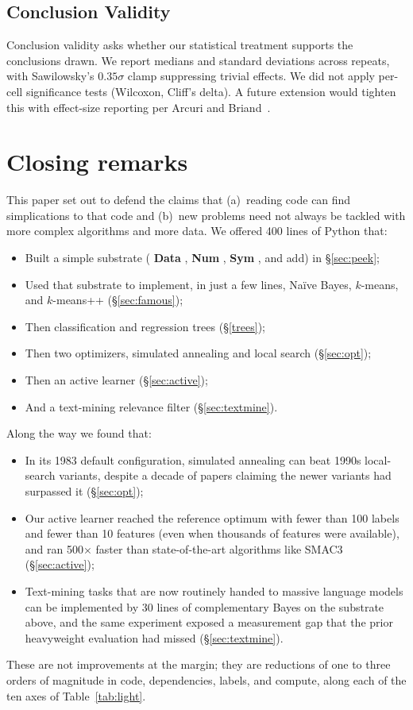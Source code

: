 \documentclass[AMA,STIX2COL]{WileyNJDv5}
\newcommand{\cls}[1]{%
  \setlength{\fboxsep}{1.5pt}%
  \colorbox{clsbg}{\sffamily\bfseries{#1}}%
}
\begin{document}
{\subsection{Conclusion Validity}
Conclusion validity asks whether our statistical treatment
supports the conclusions drawn. We report medians and
standard deviations across repeats, with Sawilowsky's
$0.35\sigma$ clamp suppressing trivial effects. We did not
apply per-cell significance tests (Wilcoxon, Cliff's delta).
A future extension would tighten this with effect-size
reporting per Arcuri and
Briand~\cite{arcuri2011practical}.

\section{Closing remarks}\label{sec:disc}

This paper set out to defend the claims 
that (a)~reading code can find simplications
to that code and (b)~new problems need not always be
tackled with more complex algorithms and more data. We offered
400 lines of Python that:
\begin{itemize}
\item Built a simple substrate (\cls{Data}, \cls{Num},
\cls{Sym}, and \textsf{add}) in \S\ref{sec:peek};
\item Used that substrate to implement, in just a few lines,
Naïve Bayes, $k$-means, and $k$-means++ (\S\ref{sec:famous});
\item Then classification and regression trees
(\S\ref{trees});
\item Then two optimizers, simulated annealing and local
search (\S\ref{sec:opt});
\item Then an active learner (\S\ref{sec:active});
\item And a text-mining relevance filter
(\S\ref{sec:textmine}).
\end{itemize}

Along the way we found that:
\begin{itemize}
\item In its 1983 default configuration, simulated annealing
can beat 1990s local-search variants, despite a decade of
papers claiming the newer variants had surpassed it
(\S\ref{sec:opt});
\item Our active learner reached the reference optimum with
fewer than 100 labels and fewer than 10 features (even when
thousands of features were available), and ran 500$\times$
faster than state-of-the-art algorithms like SMAC3
(\S\ref{sec:active});
\item Text-mining tasks that are now routinely handed to
massive language models can be implemented by 30 lines of
complementary Bayes on the substrate above, and the same
experiment exposed a measurement gap that the prior
heavyweight evaluation had missed (\S\ref{sec:textmine}).
\end{itemize}
These are not improvements at the margin; they are reductions
of one to three orders of magnitude in code, dependencies,
labels, and compute, along each of the ten axes of
Table~\ref{tab:light}.

}
\end{document}
